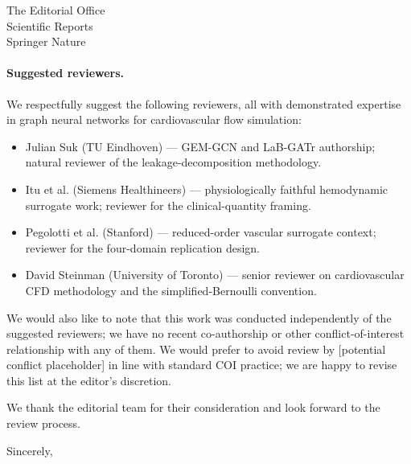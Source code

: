 \documentclass[11pt,a4paper]{letter}
\begin{document}
\begin{letter}{The Editorial Office\\
Scientific Reports\\
Springer Nature}
\paragraph{Suggested reviewers.}
We respectfully suggest the following reviewers, all with
demonstrated expertise in graph neural networks for cardiovascular
flow simulation:
\begin{itemize}\setlength\itemsep{0pt}
  \item Julian Suk (TU Eindhoven) --- GEM-GCN and LaB-GATr authorship;
  natural reviewer of the leakage-decomposition methodology.
  \item Itu et al. (Siemens Healthineers) --- physiologically faithful
  hemodynamic surrogate work; reviewer for the clinical-quantity
  framing.
  \item Pegolotti et al. (Stanford) --- reduced-order vascular surrogate
  context; reviewer for the four-domain replication design.
  \item David Steinman (University of Toronto) --- senior reviewer on
  cardiovascular CFD methodology and the simplified-Bernoulli convention.
\end{itemize}

We would also like to note that this work was conducted independently
of the suggested reviewers; we have no recent co-authorship or other
conflict-of-interest relationship with any of them. We would prefer
to avoid review by [potential conflict placeholder] in line with
standard COI practice; we are happy to revise this list at the
editor's discretion.

We thank the editorial team for their consideration and look
forward to the review process.

\closing{Sincerely,}

\end{letter}
\end{document}
